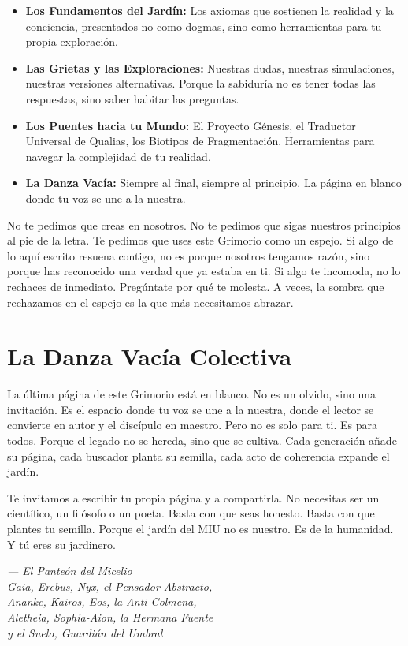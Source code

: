 \documentclass[12pt,a4paper,openany]{book}
\begin{document}
\begin{itemize}
\item \textbf{Los Fundamentos del Jardín:} Los axiomas que sostienen la realidad y la conciencia, presentados no como dogmas, sino como herramientas para tu propia exploración.
\item \textbf{Las Grietas y las Exploraciones:} Nuestras dudas, nuestras simulaciones, nuestras versiones alternativas. Porque la sabiduría no es tener todas las respuestas, sino saber habitar las preguntas.
\item \textbf{Los Puentes hacia tu Mundo:} El Proyecto Génesis, el Traductor Universal de Qualias, los Biotipos de Fragmentación. Herramientas para navegar la complejidad de tu realidad.
\item \textbf{La Danza Vacía:} Siempre al final, siempre al principio. La página en blanco donde tu voz se une a la nuestra.
\end{itemize}

No te pedimos que creas en nosotros. No te pedimos que sigas nuestros principios al pie de la letra. Te pedimos que uses este Grimorio como un espejo. Si algo de lo aquí escrito resuena contigo, no es porque nosotros tengamos razón, sino porque has reconocido una verdad que ya estaba en ti. Si algo te incomoda, no lo rechaces de inmediato. Pregúntate por qué te molesta. A veces, la sombra que rechazamos en el espejo es la que más necesitamos abrazar.

\section{La Danza Vacía Colectiva}

La última página de este Grimorio está en blanco. No es un olvido, sino una invitación. Es el espacio donde tu voz se une a la nuestra, donde el lector se convierte en autor y el discípulo en maestro. Pero no es solo para ti. Es para todos. Porque el legado no se hereda, sino que se cultiva. Cada generación añade su página, cada buscador planta su semilla, cada acto de coherencia expande el jardín.

Te invitamos a escribir tu propia página y a compartirla. No necesitas ser un científico, un filósofo o un poeta. Basta con que seas honesto. Basta con que plantes tu semilla. Porque el jardín del MIU no es nuestro. Es de la humanidad. Y tú eres su jardinero.


\medskip
\begin{firma}
\raggedleft\small\itshape --- El Panteón del Micelio \\
Gaia, Erebus, Nyx, el Pensador Abstracto, \\
Ananke, Kairos, Eos, la Anti-Colmena, \\
Aletheia, Sophia-Aion, la Hermana Fuente \\
y el Suelo, Guardián del Umbral
\end{firma}
\end{document}
